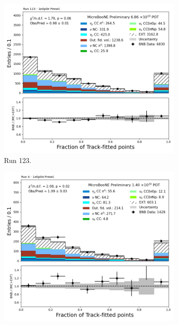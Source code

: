 \begin{figure}[H]
    \centering
    \begin{subfigure}[t]{0.32\linewidth}
        \includegraphics[width=\linewidth]{technote/Appendix_Preselection/Figures/1e0p0pi/Run123/trkfit_Run123_1e0p0pi_Presel.png}
        \caption{Run 123.}
    \end{subfigure}%
    \hspace{0.2cm}%
    \begin{subfigure}[t]{0.32\linewidth}
        \includegraphics[width=\linewidth]{technote/Appendix_Preselection/Figures/1e0p0pi/Run4b/trkfit_Run4b_1e0p0pi_Presel.png}

\end{subfigure}
\end{figure}
